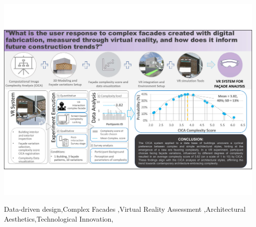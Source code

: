 \documentclass[final,5p,times]{elsarticle}%
\begin{document}
\begin{frontmatter}
\begin{abstract}


\end{abstract}



\begin{graphicalabstract}
    \centering
    \includegraphics[width= \textwidth, trim = 0 80 0 80, clip]{Images/GraphicAbstract}
    \label{fig:graphic_abstract}
\end{graphicalabstract}

\begin{highlights}

\end{highlights}

\begin{keyword}
Data-driven design\sep Complex Facades \sep Virtual Reality Assessment \sep Architectural Aesthetics\sep Technological Innovation\sep

\end{keyword}

\end{frontmatter}
%
\end{document}
